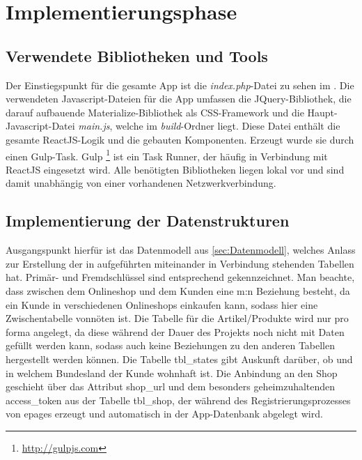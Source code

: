 \section{Implementierungsphase} 
\label{sec:Implementierungsphase}

\subsection{Verwendete Bibliotheken und Tools}
\label{sec:Tools}
Der Einstiegspunkt für die gesamte App ist die \textit{index.php}-Datei zu sehen im . Die verwendeten Javascript-Dateien für die App umfassen die JQuery-Bibliothek, die darauf aufbauende Materialize-Bibliothek als CSS-Framework und die Haupt-Javascript-Datei \textit{main.js}, welche im \textit{build}-Ordner liegt. Diese Datei enthält die gesamte ReactJS-Logik und die gebauten Komponenten. Erzeugt wurde sie durch einen Gulp-Task. Gulp \footnote{\url{http://gulpjs.com}} ist ein Task Runner, der häufig in Verbindung mit ReactJS eingesetzt wird. Alle benötigten Bibliotheken liegen lokal vor und sind damit unabhängig von einer vorhandenen Netzwerkverbindung.

\subsection{Implementierung der Datenstrukturen}
\label{sec:ImplementierungDatenstrukturen}

Ausgangspunkt hierfür ist das Datenmodell aus \ref{sec:Datenmodell}, welches Anlass zur Erstellung der in  aufgeführten miteinander in Verbindung stehenden Tabellen hat. Primär- und Fremdschlüssel sind entsprechend gekennzeichnet. Man beachte, dass zwischen dem Onlineshop und dem Kunden eine m:n Beziehung besteht, da ein Kunde in verschiedenen Onlineshops einkaufen kann, sodass hier eine Zwischentabelle vonnöten ist. Die Tabelle für die Artikel/Produkte wird nur pro forma angelegt, da diese während der Dauer des Projekts noch nicht mit Daten gefüllt werden kann, sodass auch keine Beziehungen zu den anderen Tabellen hergestellt werden können. Die Tabelle tbl\_states gibt Auskunft darüber, ob und in welchem Bundesland der Kunde wohnhaft ist. Die Anbindung an den Shop geschieht über das Attribut shop\_url und dem besonders geheimzuhaltenden access\_token aus der Tabelle tbl\_shop, der während des Registrierungsprozesses von epages erzeugt und automatisch in der App-Datenbank abgelegt wird.

